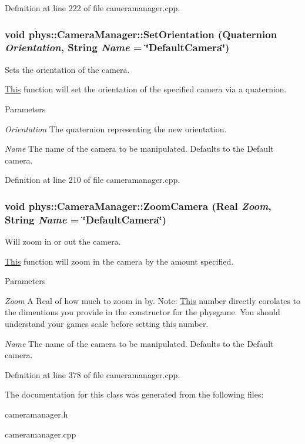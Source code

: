 Definition at line 222 of file cameramanager.cpp.

\hypertarget{classphys_1_1CameraManager_a9d0fac66fbc2eb4b7247c9661427afb8}{
\subsubsection[{SetOrientation}]{\setlength{\rightskip}{0pt plus 5cm}void phys::CameraManager::SetOrientation ({\bf Quaternion} {\em Orientation}, \/  {\bf String} {\em Name} = {\ttfamily \char`\"{}DefaultCamera\char`\"{}})}}
\label{d9/d91/classphys_1_1CameraManager_a9d0fac66fbc2eb4b7247c9661427afb8}


Sets the orientation of the camera. 

\hyperlink{structThis}{This} function will set the orientation of the specified camera via a quaternion. 
\begin{DoxyParams}{Parameters}
\item[{\em Orientation}]The quaternion representing the new orientation. \item[{\em Name}]The name of the camera to be manipulated. Defaults to the Default camera. \end{DoxyParams}


Definition at line 210 of file cameramanager.cpp.

\hypertarget{classphys_1_1CameraManager_aa5a37dbdd45a53bc3dfd4cfa0a94bd42}{
\subsubsection[{ZoomCamera}]{\setlength{\rightskip}{0pt plus 5cm}void phys::CameraManager::ZoomCamera ({\bf Real} {\em Zoom}, \/  {\bf String} {\em Name} = {\ttfamily \char`\"{}DefaultCamera\char`\"{}})}}
\label{d9/d91/classphys_1_1CameraManager_aa5a37dbdd45a53bc3dfd4cfa0a94bd42}


Will zoom in or out the camera. 

\hyperlink{structThis}{This} function will zoom in the camera by the amount specified. 
\begin{DoxyParams}{Parameters}
\item[{\em Zoom}]A Real of how much to zoom in by. Note: \hyperlink{structThis}{This} number directly corolates to the dimentions you provide in the constructor for the physgame. You should understand your games scale before setting this number. \item[{\em Name}]The name of the camera to be manipulated. Defaults to the Default camera. \end{DoxyParams}


Definition at line 378 of file cameramanager.cpp.



The documentation for this class was generated from the following files:\begin{DoxyCompactItemize}
\item 
cameramanager.h\item 
cameramanager.cpp\end{DoxyCompactItemize}
